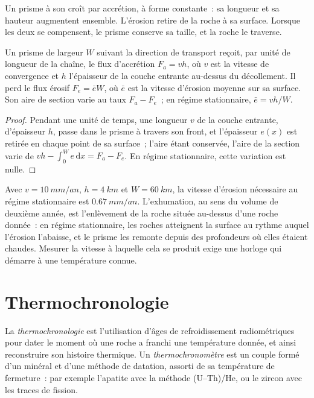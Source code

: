 Un prisme à son  croît par accrétion, à forme constante~: sa longueur
et sa hauteur augmentent ensemble. L'érosion retire de la roche à sa surface. Lorsque
les deux se compensent, le prisme conserve sa taille, et la roche le traverse.

\begin{proposition}\label{prop:b3:orogenic-wedges:flux}
Un prisme de largeur $W$ suivant la direction de transport reçoit, par unité de longueur
de la chaîne, le flux d'accrétion $F_a = v h$, où $v$ est la vitesse de convergence et $h$
l'épaisseur de la couche entrante au-dessus du décollement. Il perd le flux érosif
$F_e = \bar e W$, où $\bar e$ est la vitesse d'érosion moyenne sur sa surface. Son aire
de section varie au taux $F_a -
F_e$~; en régime stationnaire, $\bar e = vh/W$.
\end{proposition}

\begin{proof}
Pendant une unité de temps, une longueur $v$ de la couche entrante, d'épaisseur $h$, passe
dans le prisme à travers son front, et l'épaisseur $e(x)$ est retirée en chaque
point de sa surface~; l'aire étant conservée, l'aire de la section varie de
$vh - \int_0^W e\,\mathrm dx = F_a - F_e$. En régime stationnaire, cette
variation est nulle.
\end{proof}

Avec $v = \qty{10}{mm/an}$, $h = \qty{4}{km}$ et $W = \qty{60}{km}$, la
vitesse d'érosion nécessaire au régime stationnaire est $\qty{0.67}{mm/an}$. L'exhumation, au
sens du volume de deuxième année, est l'enlèvement de la roche située au-dessus d'une
roche donnée~: en régime stationnaire, les roches atteignent la surface au rythme auquel l'érosion
l'abaisse, et le prisme les remonte depuis des profondeurs où elles étaient chaudes. Mesurer
la vitesse à laquelle cela se produit exige une horloge qui démarre à une température connue.

\section{Thermochronologie}\label{sec:b3:orogenic-wedges:thermochronology}

\begin{definition}\label{def:b3:orogenic-wedges:thermochronology}
La \emph{thermochronologie} est l'utilisation
d'âges de refroidissement radiométriques pour dater le moment où une roche a
franchi une température donnée, et ainsi reconstruire son histoire thermique. Un
\emph{thermochronomètre} est un couple formé d'un minéral et
d'une méthode de datation, assorti de sa température de fermeture~: par exemple
l'apatite avec la méthode (U--Th)/He, ou le zircon avec les traces de fission.
\end{definition}

